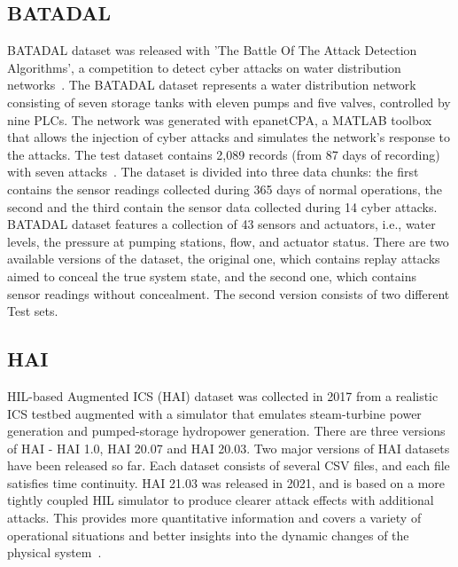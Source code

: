 \documentclass[english,12pt]{article}
\begin{document}
\subsection{BATADAL} \label{BATADAL}

BATADAL dataset was released with 'The Battle Of The Attack Detection Algorithms',
a competition to detect cyber attacks on water distribution networks~\cite{DBLP:conf/ccs/TurrinETC20}. The BATADAL
dataset represents a water distribution network consisting of seven storage tanks
with eleven pumps and five valves, controlled by nine PLCs. The network was generated
with epanetCPA, a MATLAB toolbox that allows the injection of cyber attacks and
simulates the network's response to the attacks. The test dataset contains 2,089
records (from 87 days of recording) with seven attacks~\cite{DBLP:journals/corr/abs-1907-01216}. The dataset is divided into
three data chunks: the first contains the sensor readings collected during 365 days
of normal operations, the second and the third contain the sensor data collected
during 14 cyber attacks. BATADAL dataset features a collection of 43 sensors and
actuators, i.e., water levels, the pressure at pumping stations, flow, and actuator
status. There are two available versions of the dataset, the original one, which
contains replay attacks aimed to conceal the true system state, and the second one, which
contains sensor readings without concealment. The second version consists of two different Test sets.


\subsection{HAI} \label{Hai}

HIL-based Augmented ICS (HAI) dataset was collected in 2017 from a realistic ICS
testbed augmented with a simulator that emulates steam-turbine
power generation and pumped-storage hydropower generation. 
There are three versions of HAI - HAI 1.0, HAI 20.07 and HAI 20.03. 
Two major versions of HAI datasets have been released so far. Each dataset
consists of several CSV files, and each file satisfies time continuity. HAI 21.03
was released in 2021, and is based on a more tightly coupled HIL simulator to
produce clearer attack effects with additional attacks. This provides more
quantitative information and covers a variety of operational situations and
better insights into the dynamic changes of the physical system~\cite{DBLP:conf/uss/ShinLYK20}. 
\end{document}
